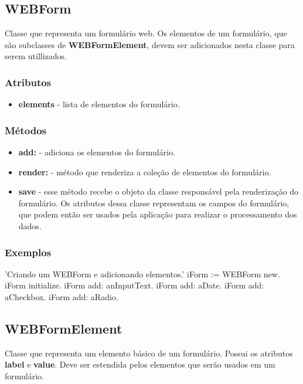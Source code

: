 \subsection{WEBForm} 
\label{subsec:webform}
Classe que representa um formulário web. Os elementos de um formulário, que são subclasses de \textbf{WEBFormElement}, devem ser adicionados nesta classe para serem utillizados.

\subsubsection{Atributos}

\begin{itemize}
 \item \textbf{elements} - lista de elementos do formulário.
\end{itemize}

\subsubsection{Métodos}

\begin{itemize}
 \item \textbf{add:} - adiciona os elementos do formulário.
 \item \textbf{render:} - método que renderiza a coleção de elementos do formulário.
 \item \textbf{save} - esse método recebe o objeto da classe responsável pela renderização do formulário. Os atributos dessa classe representam os campos do formulário, 
 que podem então ser usados pela aplicação para realizar o processamento dos dados.
\end{itemize}

\subsubsection{Exemplos}

\begin{godCode}
'Criando um WEBForm e adicionando elementos.'
iForm := WEBForm new.
iForm initialize.
iForm add: anInputText.
iForm add: aDate.
iForm add: aCheckbox.
iForm add: aRadio.
\end{godCode}


\subsection{WEBFormElement} 
\label{subsec:webformelement}
Classe que representa um elemento básico de um formulário. Possui os atributos \textbf{label} e \textbf{value}. Deve ser estendida pelos elementos que serão usados em um formulário.

